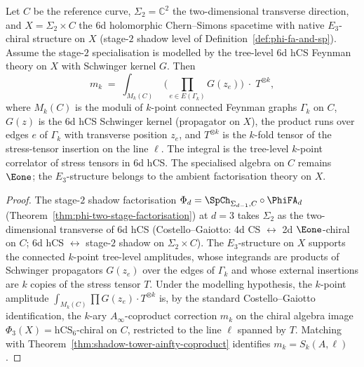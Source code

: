 \begin{proposition}
\label{thm:6d-hcs-feynman}
Let $C$ be the reference curve, $\Sigma_2 = \mathbb{C}^2$ the
two-dimensional transverse direction, and $X = \Sigma_2 \times C$
the 6d holomorphic Chern--Simons spacetime with native $E_3$-chiral
structure on $X$ (stage-$2$ shadow level of
Definition~\ref{def:phi-fa-and-sp}). Assume the stage-$2$ specialisation
is modelled by the tree-level 6d hCS Feynman theory on $X$ with
Schwinger kernel $G$. Then
\begin{equation}
\label{eq:6d-hcs-m-k-integral}
m_k \;=\; \int_{M_k(C)} \; \Biggl( \prod_{e \in E(\Gamma_k)} G(z_e) \Biggr) \;
\cdot \; T^{\otimes k},
\end{equation}
where $M_k(C)$ is the moduli of $k$-point connected Feynman graphs
$\Gamma_k$ on $C$, $G(z)$ is the 6d hCS Schwinger kernel (propagator
on $X$), the product runs over edges $e$ of $\Gamma_k$ with
transverse position $z_e$, and $T^{\otimes k}$ is the $k$-fold
tensor of the stress-tensor insertion on the line $\ell$. The
integral is the tree-level $k$-point correlator of stress tensors
in 6d hCS. The specialised algebra on $C$ remains $\Eone$; the
$E_3$-structure belongs to the ambient factorisation theory on $X$.
\end{proposition}

\begin{proof}[Proof]
The stage-$2$ shadow factorisation
$\Phi_d = \SpCh_{\Sigma_{d - 1}, C} \circ \PhiFA_d$
(Theorem~\ref{thm:phi-two-stage-factorisation}) at $d = 3$ takes
$\Sigma_2$ as the two-dimensional
transverse of 6d hCS (Costello--Gaiotto: 4d CS $\leftrightarrow$
2d $\Eone$-chiral on $C$; 6d hCS $\leftrightarrow$ stage-$2$ shadow
on $\Sigma_2 \times C$). The $E_3$-structure on $X$ supports the
connected $k$-point tree-level amplitudes, whose integrands are
products of Schwinger propagators $G(z_e)$ over the edges of
$\Gamma_k$ and whose external insertions are $k$ copies of the
stress tensor $T$. Under the modelling hypothesis, the $k$-point
amplitude $\int_{M_k(C)} \prod
G(z_e) \cdot T^{\otimes k}$ is, by the standard Costello--Gaiotto
identification, the $k$-ary $A_\infty$-coproduct correction $m_k$ on
the chiral algebra image $\Phi_3(X) = \mathrm{hCS}_6$-chiral on $C$,
restricted to the line $\ell$ spanned by $T$. Matching with
Theorem~\ref{thm:shadow-tower-ainfty-coproduct} identifies $m_k =
S_k(A, \ell)$.
\end{proof}

